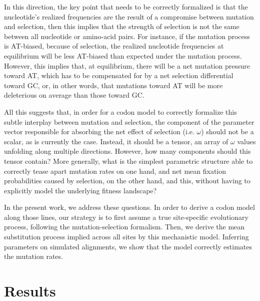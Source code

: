 In this direction, the key point that needs to be correctly formalized is that the nucleotide's realized frequencies are the result of a compromise between mutation and selection, then this implies that the strength of selection is not the same between all nucleotide or amino-acid pairs.
For instance, if the mutation process is AT-biased, because of selection, the realized nucleotide frequencies at equilibrium will be less AT-biased than expected under the mutation process.
However, this implies that, at equilibrium, there will be a net mutation pressure toward AT, which has to be compensated for by a net selection differential toward GC, or, in other words, that mutations toward AT will be more deleterious on average than those toward GC.

All this suggests that, in order for a codon model to correctly formalize this subtle interplay between mutation and selection, the component of the parameter vector responsible for absorbing the net effect of selection (i.e. $\omega$) should not be a scalar, as is currently the case.
Instead, it should be a tensor, an array of $\omega$ values unfolding along multiple directions.
However, how many components should this tensor contain?
More generally, what is the simplest parametric structure able to correctly tease apart mutation rates on one hand, and net mean fixation probabilities caused by selection, on the other hand, and this, without having to explicitly model the underlying fitness landscape?

In the present work, we address these questions.
In order to derive a codon model along those lines, our strategy is to first assume a true site-specific evolutionary process, following the mutation-selection formalism.
Then, we derive the mean substitution process implied across all sites by this mechanistic model.
Inferring parameters on simulated alignments, we show that the model correctly estimates the mutation rates.



\section{Results}

